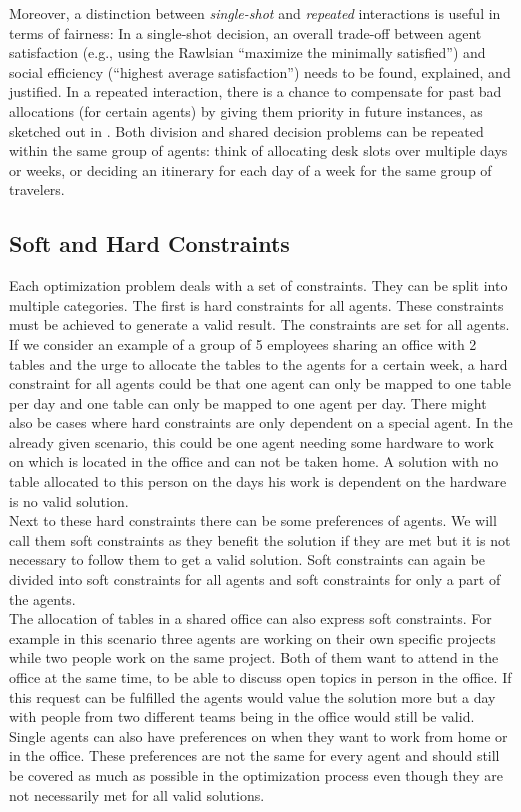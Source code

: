 \documentclass[german, a4paper, 11pt, oneside]{scrbook}
\begin{document}
Moreover, a distinction between \emph{single-shot} and \emph{repeated} interactions is useful in terms of fairness: In a single-shot decision, an overall trade-off between agent satisfaction (e.g., using the Rawlsian ``maximize the minimally satisfied'') and social efficiency (``highest average satisfaction'') needs to be found, explained, and justified. In a repeated interaction, there is a chance to compensate for past bad allocations (for certain agents) by giving them priority in future instances, as sketched out in \cite{.2022}.  Both division and shared decision problems can be repeated within the same group of agents: think of allocating desk slots over multiple days or weeks, or deciding an itinerary for each day of a week for the same group of travelers.

\subsection{Soft and Hard Constraints}
Each optimization problem deals with a set of constraints. They can be split into multiple categories. The first is hard constraints for all agents. These constraints must be achieved to generate a valid result. The constraints are set for all agents.\cite{.2022} \\If we consider an example of a group of 5 employees sharing an office with 2 tables and the urge to allocate the tables to the agents for a certain week, a hard constraint for all agents could be that one agent can only be mapped to one table per day and one table can only be mapped to one agent per day. There might also be cases where hard constraints are only dependent on a special agent. In the already given scenario, this could be one agent needing some hardware to work on which is located in the office and can not be taken home. A solution with no table allocated to this person on the days his work is dependent on the hardware is no valid solution. \\Next to these hard constraints there can be some preferences of agents. We will call them soft constraints as they benefit the solution if they are met but it is not necessary to follow them to get a valid solution. \cite{.2020,.2022} Soft constraints can again be divided into soft constraints for all agents and soft constraints for only a part of the agents. \\The allocation of tables in a shared office can also express soft constraints. For example in this scenario three agents are working on their own specific projects while two people work on the same project. Both of them want to attend in the office at the same time, to be able to discuss open topics in person in the office. If this request can be fulfilled the agents would value the solution more but a day with people from two different teams being in the office would still be valid. \\Single agents can also have preferences on when they want to work from home or in the office. These preferences are not the same for every agent and should still be covered as much as possible in the optimization process even though they are not necessarily met for all valid solutions. \cite{.2022}
\end{document}
